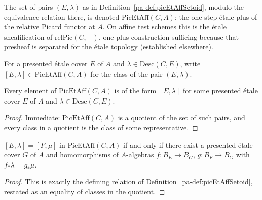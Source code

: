 \begin{definition}
  \label{pa-def:PicEtAff}
  \leanok

  The set of pairs \((E,\lambda)\) as in Definition~\ref{pa-def:picEtAffSetoid}, modulo the
  equivalence relation there, is denoted \(\mathrm{PicEtAff}(C,A)\): the one-step \'etale plus
  of the relative Picard functor at \(A\). On affine test schemes this is the \'etale
  sheafification of \(\mathrm{relPic}(C,-)\), one plus construction sufficing because that
  presheaf is separated for the \'etale topology (established elsewhere).
\end{definition}

\begin{definition}
  \label{pa-def:PicEtAff_mk}
  \leanok

  For a presented \'etale cover \(E\) of \(A\) and \(\lambda \in \mathrm{Desc}(C,E)\), write
  \([E,\lambda] \in \mathrm{PicEtAff}(C,A)\) for the class of the pair \((E,\lambda)\).
\end{definition}

\begin{lemma}
  \label{pa-lem:PicEtAff_ind}
  \leanok

  Every element of \(\mathrm{PicEtAff}(C,A)\) is of the form \([E,\lambda]\) for some presented
  \'etale cover \(E\) of \(A\) and \(\lambda \in \mathrm{Desc}(C,E)\).
\end{lemma}
\begin{proof}
  \leanok
  Immediate: \(\mathrm{PicEtAff}(C,A)\) is a quotient of the set of such pairs, and every class
  in a quotient is the class of some representative.
\end{proof}

\begin{theorem}
  \label{pa-thm:PicEtAff_mk_eq_mk_iff}
  \leanok

  \([E,\lambda] = [F,\mu]\) in \(\mathrm{PicEtAff}(C,A)\) if and only if there exist a presented
  \'etale cover \(G\) of \(A\) and homomorphisms of \(A\)-algebras \(f \colon B_E \to B_G\),
  \(g \colon B_F \to B_G\) with \(f_{*}\lambda = g_{*}\mu\).
\end{theorem}
\begin{proof}
  \leanok
  This is exactly the defining relation of Definition~\ref{pa-def:picEtAffSetoid}, restated as an
  equality of classes in the quotient.
\end{proof}

